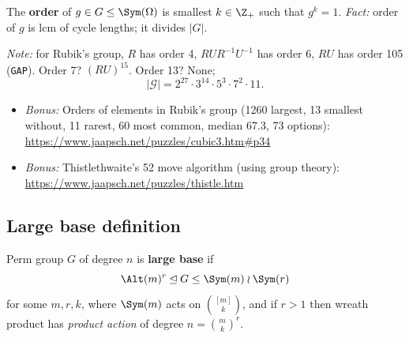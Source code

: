 \documentclass{beamer}
\newcommand{\RC}{\mathcal{G}}
\begin{document}
\begin{slide}
    The \textbf{order} of $g \in G \leq \Sym(\Omega)$ is smallest $k \in \Z_+$ such that $g^k = 1$. \textit{Fact:} order of $g$ is lcm of cycle lengths; it divides $|G|$.

    \textit{Note:} for Rubik's group, $R$ has order 4, $RUR^{-1}U^{-1}$ has order 6, $RU$ has order 105 (\texttt{GAP}). Order 7? \pause $(RU)^{15}$. Order 13? \pause None;
    $$|\RC| = 2^{27} \cdot 3^{14} \cdot 5^3 \cdot 7^2 \cdot 11.$$

    \small
    \begin{itemize}
        \item \textit{Bonus:} Orders of elements in Rubik's group (1260 largest, 13 smallest without, 11 rarest, 60 most common, median 67.3, 73 options): \url{https://www.jaapsch.net/puzzles/cubic3.htm\#p34}
        \item \textit{Bonus:} Thistlethwaite's 52 move algorithm (using group theory): \url{https://www.jaapsch.net/puzzles/thistle.htm}
    \end{itemize}
\end{slide}

\subsection{Large base definition}

\begin{slide}
    \begin{definition}
        \vspace{0pt}
        Perm group $G$ of degree $n$ is \textbf{large base} if
        $$\Alt(m)^r \unlhd G \leq \Sym(m) \wr \Sym(r)$$
        for some $m,r,k$, where $\Sym(m)$ acts on $\binom{[m]}{k}$, and if $r > 1$ then wreath product has \textit{product action} of degree $n = \binom{m}{k}^r$.
    \end{definition}
\end{slide}


\end{document}
